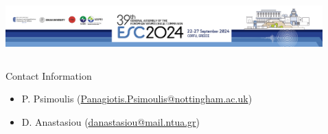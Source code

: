 \documentclass[final,a0,portrait]{beamer}
\newlength{\sepwid}
\newlength{\onecolwid}
\newlength{\twocolwid}
\newlength{\threecolwid}
\begin{document}
\begin{frame}[t]
\begin{columns}[t]
\begin{column}{\onecolwid}
\begin{minipage}{\threecolwid}
\begin{column}{\twocolwid}
		\vspace*{1.0\baselineskip}
		\begin{center}
		  \includegraphics[width=.97\textwidth]{figures/ESC2024_webheader.png}
		\end{center}
  \end{column}
  \begin{column}{\onecolwid}
  \vspace*{1.0\baselineskip}
    \begin{alertblock}{Contact Information}
    {\small
  		\begin{itemize}
	  		\item P. Psimoulis (\href{Panagiotis.Psimoulis@nottingham.ac.uk}{Panagiotis.Psimoulis@nottingham.ac.uk})
		  	\item D. Anastasiou (\href{danastasiou@mail.ntua.gr}{danastasiou@mail.ntua.gr})
		  \end{itemize}
		  }
  	\end{alertblock}
  \end{column}
\end{minipage}

%




\end{column} %

\begin{column}{\sepwid}\end{column}

\begin{column}{\twocolwid} 


\end{column}
\end{columns}
\end{frame}
\end{document}
